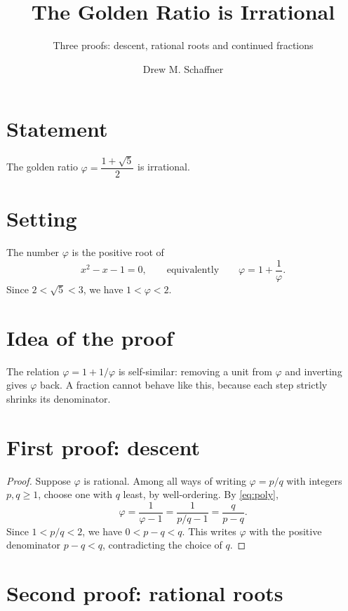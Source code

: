 \documentclass[11pt,a4paper]{article}
\title{The Golden Ratio is Irrational}
\subtitle{Three proofs: descent, rational roots and continued fractions}
\author{Drew M. Schaffner}
\begin{document}
\maketitle

\section{Statement}

\begin{theorem}\label{thm:main}
  The golden ratio $\varphi = \dfrac{1 + \sqrt5}{2}$ is irrational.
\end{theorem}

\section{Setting}

The number $\varphi$ is the positive root of
\begin{equation}\label{eq:poly}
  x^2 - x - 1 = 0, \qquad\text{equivalently}\qquad \varphi = 1 + \frac{1}{\varphi}.
\end{equation}
Since $2 < \sqrt5 < 3$, we have $1 < \varphi < 2$.

\section{Idea of the proof}

The relation $\varphi = 1 + 1/\varphi$ is self-similar: removing a unit from $\varphi$
and inverting gives $\varphi$ back. A fraction cannot behave like this, because each
step strictly shrinks its denominator.

\section{First proof: descent}

\begin{proof}
  Suppose $\varphi$ is rational. Among all ways of writing $\varphi = p/q$ with
  integers $p, q \geq 1$, choose one with $q$ least, by well-ordering. By
  \eqref{eq:poly},
  \[
    \varphi = \frac{1}{\varphi - 1} = \frac{1}{p/q - 1} = \frac{q}{p - q}.
  \]
  Since $1 < p/q < 2$, we have $0 < p - q < q$. This writes $\varphi$ with the positive
  denominator $p - q < q$, contradicting the choice of $q$.
\end{proof}

\section{Second proof: rational roots}
\end{document}
